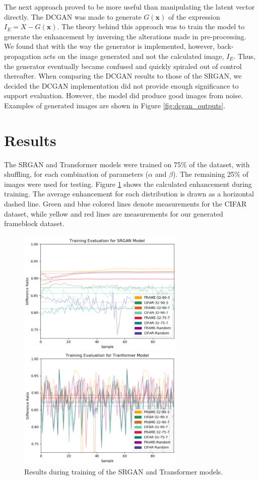 \documentclass[letterpaper]{article} %
\begin{document}
The next approach proved to be more useful than manipulating the latent vector directly.
The DCGAN was made to generate $G(\mathbf{x})$ of
the expression $I_E = X - G(\mathbf{x})$. The theory behind this approach was to train
the model to generate the enhancement by inversing the alterations made in pre-processing.
We found that with the way the generator is implemented, however,
back-propagation acts on the image generated and not the calculated image, $I_E$.
Thus, the generator eventually became confused and quickly spiraled out of control thereafter.
When comparing the DCGAN results to those of the SRGAN,
we decided the DCGAN implementation did not provide enough significance to support evaluation.
However, the model did produce good images from noise.
Examples of generated images are shown in Figure \ref{fig:dcgan_outputs}.

\section{Results}
The SRGAN and Transformer models were trained on 75\% of the dataset, with shuffling,
for each combination of parameters ($\alpha$ and $\beta$).
The remaining 25\% of images were used for testing.
Figure \ref{fig:training_results} shows the calculated enhancement
during training.
The average enhancement for each distribution is drawn as a horizontal dashed line.
Green and blue colored lines denote measurements for the CIFAR dataset, while
yellow and red lines are measurements for our generated frameblock dataset.

\begin{figure}[h!]
\centerline{\includegraphics[width=8cm]{srgan_training_results.png}}
\centerline{\includegraphics[width=8cm]{attn_training_results.png}}
\caption{Results during training of the SRGAN and Transformer models.}
\label{fig:training_results}
\end{figure}
\end{document}
